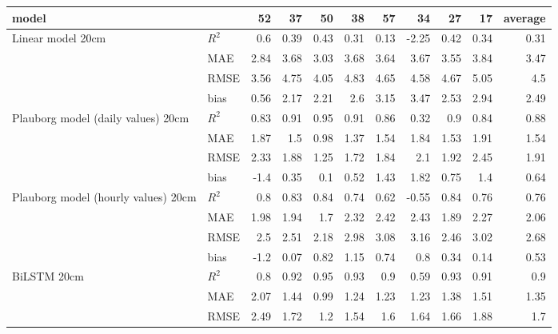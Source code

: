 \begin{tabular}{llrrrrrrrrr}
\hline
 model                               &       &    52 &    37 &    50 &   38 &   57 &    34 &   27 &   17 &   average \\
\hline
 Linear model 20cm                   & $R^2$ &  0.6  &  0.39 &  0.43 & 0.31 & 0.13 & -2.25 & 0.42 & 0.34 &      0.31 \\
                                     & MAE   &  2.84 &  3.68 &  3.03 & 3.68 & 3.64 &  3.67 & 3.55 & 3.84 &      3.47 \\
                                     & RMSE  &  3.56 &  4.75 &  4.05 & 4.83 & 4.65 &  4.58 & 4.67 & 5.05 &      4.5  \\
                                     & bias  &  0.56 &  2.17 &  2.21 & 2.6  & 3.15 &  3.47 & 2.53 & 2.94 &      2.49 \\
 Plauborg model (daily values) 20cm  & $R^2$ &  0.83 &  0.91 &  0.95 & 0.91 & 0.86 &  0.32 & 0.9  & 0.84 &      0.88 \\
                                     & MAE   &  1.87 &  1.5  &  0.98 & 1.37 & 1.54 &  1.84 & 1.53 & 1.91 &      1.54 \\
                                     & RMSE  &  2.33 &  1.88 &  1.25 & 1.72 & 1.84 &  2.1  & 1.92 & 2.45 &      1.91 \\
                                     & bias  & -1.4  &  0.35 &  0.1  & 0.52 & 1.43 &  1.82 & 0.75 & 1.4  &      0.64 \\
 Plauborg model (hourly values) 20cm & $R^2$ &  0.8  &  0.83 &  0.84 & 0.74 & 0.62 & -0.55 & 0.84 & 0.76 &      0.76 \\
                                     & MAE   &  1.98 &  1.94 &  1.7  & 2.32 & 2.42 &  2.43 & 1.89 & 2.27 &      2.06 \\
                                     & RMSE  &  2.5  &  2.51 &  2.18 & 2.98 & 3.08 &  3.16 & 2.46 & 3.02 &      2.68 \\
                                     & bias  & -1.2  &  0.07 &  0.82 & 1.15 & 0.74 &  0.8  & 0.34 & 0.14 &      0.53 \\
 BiLSTM 20cm                         & $R^2$ &  0.8  &  0.92 &  0.95 & 0.93 & 0.9  &  0.59 & 0.93 & 0.91 &      0.9  \\
                                     & MAE   &  2.07 &  1.44 &  0.99 & 1.24 & 1.23 &  1.23 & 1.38 & 1.51 &      1.35 \\
                                     & RMSE  &  2.49 &  1.72 &  1.2  & 1.54 & 1.6  &  1.64 & 1.66 & 1.88 &      1.7  \\

\end{tabular}
